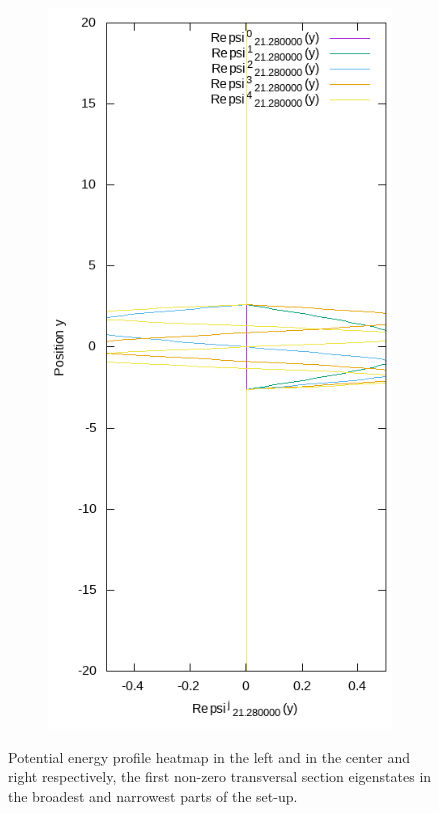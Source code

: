 \documentclass[11pt, a4paper]{article} %
\begin{document}
\begin{figure}[h!]
\begin{subfigure}[b]{0.15\linewidth}
    \includegraphics[width=\linewidth]{Eig2.png}
  \end{subfigure}
  \caption{Potential energy profile heatmap in the left and in the center and right respectively, the first non-zero transversal section eigenstates in the broadest and narrowest parts of the set-up.}
  \label{fig:pot}
\end{figure}
\end{document}
